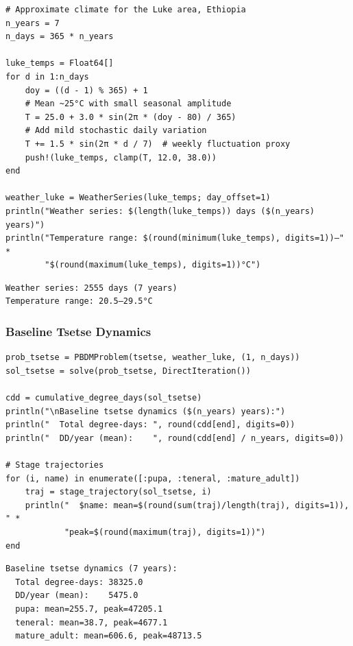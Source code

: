 \begin{verbatim}
# Approximate climate for the Luke area, Ethiopia
n_years = 7
n_days = 365 * n_years

luke_temps = Float64[]
for d in 1:n_days
    doy = ((d - 1) % 365) + 1
    # Mean ~25°C with small seasonal amplitude
    T = 25.0 + 3.0 * sin(2π * (doy - 80) / 365)
    # Add mild stochastic daily variation
    T += 1.5 * sin(2π * d / 7)  # weekly fluctuation proxy
    push!(luke_temps, clamp(T, 12.0, 38.0))
end

weather_luke = WeatherSeries(luke_temps; day_offset=1)
println("Weather series: $(length(luke_temps)) days ($(n_years) years)")
println("Temperature range: $(round(minimum(luke_temps), digits=1))–" *
        "$(round(maximum(luke_temps), digits=1))°C")
\end{verbatim}




\begin{verbatim}
Weather series: 2555 days (7 years)
Temperature range: 20.5–29.5°C
\end{verbatim}



\subsubsection{Baseline Tsetse Dynamics}



\label{13819118969230541372}{}



\begin{verbatim}
prob_tsetse = PBDMProblem(tsetse, weather_luke, (1, n_days))
sol_tsetse = solve(prob_tsetse, DirectIteration())

cdd = cumulative_degree_days(sol_tsetse)
println("\nBaseline tsetse dynamics ($(n_years) years):")
println("  Total degree-days: ", round(cdd[end], digits=0))
println("  DD/year (mean):    ", round(cdd[end] / n_years, digits=0))

# Stage trajectories
for (i, name) in enumerate([:pupa, :teneral, :mature_adult])
    traj = stage_trajectory(sol_tsetse, i)
    println("  $name: mean=$(round(sum(traj)/length(traj), digits=1)), " *
            "peak=$(round(maximum(traj), digits=1))")
end
\end{verbatim}




\begin{verbatim}
Baseline tsetse dynamics (7 years):
  Total degree-days: 38325.0
  DD/year (mean):    5475.0
  pupa: mean=255.7, peak=47205.1
  teneral: mean=38.7, peak=4677.1
  mature_adult: mean=606.6, peak=48713.5
\end{verbatim}



